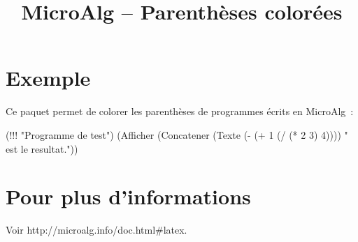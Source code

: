 \documentclass{article}
\title{MicroAlg -- Parenth\`eses color\'ees}
\author{}
\date{}
\begin{document}
\maketitle

\section{Exemple}

Ce paquet permet de colorer les parenth\`eses de programmes \'ecrits en MicroAlg~:

\begin{microalg}
(!!! "Programme de test")
(Afficher (Concatener (Texte (- (+ 1 (/ (* 2 3) 4)))) " est le resultat."))
\end{microalg}

\section{Pour plus d'informations}

Voir http://microalg.info/doc.html\#latex.
\end{document}
